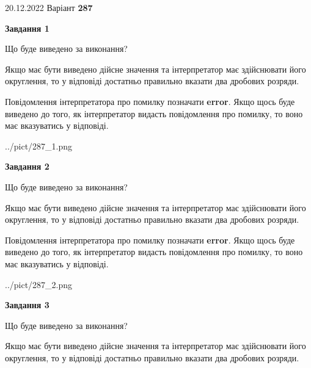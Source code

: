 \documentclass[12pt, ukrainian]{article}
\begin{document}
{20.12.2022 Варіант \No \textbf { 287 }\par}
{
\begin {Large}

{\begin {center}\textbf{Завдання 1}\end {center}}\par
Що буде виведено за виконання? \par

Якщо має бути виведено дійсне значення та інтерпретатор має здійснювати його округлення, 
то у відповіді достатньо правильно вказати два дробових розряди.

Повідомлення інтерпретатора про помилку позначати \textbf{error}.
Якщо щось буде виведено до того, як інтерпретатор видасть повідомлення про помилку, 
то воно має вказуватись у відповіді. \par

\begin{center}
	{../pict/287_1.png}
\end{center}
\newpage

{\begin {center}\textbf{Завдання 2}\end {center}}\par
Що буде виведено за виконання? \par

Якщо має бути виведено дійсне значення та інтерпретатор має здійснювати його округлення, 
то у відповіді достатньо правильно вказати два дробових розряди.

Повідомлення інтерпретатора про помилку позначати \textbf{error}.
Якщо щось буде виведено до того, як інтерпретатор видасть повідомлення про помилку, 
то воно має вказуватись у відповіді. \par

\begin{center}
	{../pict/287_2.png}
\end{center}
\newpage

{\begin {center}\textbf{Завдання 3}\end {center}}\par
Що буде виведено за виконання? \par

Якщо має бути виведено дійсне значення та інтерпретатор має здійснювати його округлення, 
то у відповіді достатньо правильно вказати два дробових розряди.


\end{Large}}
\end{document}
